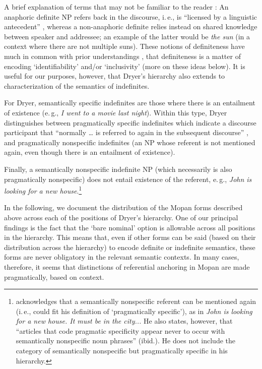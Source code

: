 \documentclass[output=paper]{langsci/langscibook}
\begin{document}
A brief explanation of terms that may not be familiar to the reader \citep[see][e236-e237]{dryer:14}:  An anaphoric definite NP refers back in the discourse, i.\,e., is ``licensed by a linguistic antecedent'' \citep[][e236]{dryer:14}, whereas a non-anaphoric definite relies instead on shared knowledge between speaker and addressee; an example of the latter would be {\emph{the sun}} (in a context where there are not multiple suns). These notions of definiteness have much in common with prior understandings \citep[e.\,g.,][]{hawkins:78,lyons:99}, that definiteness is a matter of encoding `identifiability' and/or `inclusivity' (more on these ideas below). It is useful for our purposes, however, that Dryer's hierarchy also extends to characterization of the semantics of indefinites. 

{
For Dryer, semantically specific indefinites are those where there is an entailment of existence (e.\,g., {\emph{I went to a movie last night}}).  Within this type, Dryer distinguishes between pragmatically specific indefinites which indicate a discourse participant that ``normally … is referred to again in the subsequent discourse'' \citep[][e236]{dryer:14}, and pragmatically nonspecific indefinites (an NP whose referent is not mentioned again, even though there is an entailment of existence).
}

Finally, a semantically nonspecific indefinite NP (which necessarily is also pragmatically nonspecific) does not entail existence of the referent, e.\,g., {\emph{John is looking for a new house}}.\footnote{\cite[][e237]{dryer:14} acknowledges that a semantically nonspecific referent can be mentioned again (i.\,e., could fit his definition of `pragmatically specific'), as in {\emph{John is looking for a new house.  It must be in the city...}} He also states, however, that ``articles that code pragmatic specificity appear never to occur with semantically nonspecific noun phrases'' (ibid.).  He does not include the category of semantically nonspecific but pragmatically specific in his hierarchy.}

In the following, we document the distribution of the Mopan forms described above across each of the positions of Dryer's hierarchy.  One of our principal findings is the fact that the `bare nominal' option is allowable across all positions in the hierarchy. This means that, even if other forms can be said (based on their distribution across the hierarchy) to encode definite or indefinite semantics, these forms are never obligatory in the relevant semantic contexts. In many cases, therefore, it seems that distinctions of referential anchoring in Mopan are made pragmatically, based on context. 
\end{document}
